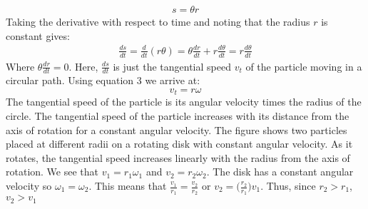 \documentclass[a4paper]{article}
\newcommand\der[2]{\frac{d #1}{d #2}}
\def\centerarc[#1](#2)(#3:#4:#5){\draw[#1] ($(#2)+({#5*cos(#3)},{#5*sin(#3)})$) arc (#3:#4:#5)}
\begin{document}
\begin{align*}
    s = \theta r
\end{align*}
\newpage
\noindent Taking the derivative with respect to time and noting that the radius $r$ is constant gives:
\begin{align*}
    \der{s}{t} = \der{}{t}(r\theta) = \theta\der{r}{t} + r\der{\theta}{t} = r\der{\theta}{t}
\end{align*}
Where $\theta\der{r}{t} = 0$. Here, $\der{s}{t}$ is just the tangential speed $v_t$ of the particle moving in a circular path. Using equation 3 we arrive at:
\begin{equation}
    v_t = r\omega
\end{equation}
The tangential speed of the particle is its angular velocity times the radius of the circle. The tangential speed of the particle increases with its distance from the axis of rotation for a constant angular velocity. The figure shows two particles placed at different radii on a rotating disk with constant angular velocity. As it rotates, the tangential speed increases linearly with the radius from the axis of rotation. We see that $v_1 = r_1\omega_1$ and $v_2 = r_2\omega_2$. The disk has a constant angular velocity so $\omega_1 = \omega_2$. This means that $\frac{v_1}{r_1} = \frac{v_2}{r_2}$ or $v_2 = \big(\frac{r_2}{r_1}\big)v_1$. Thus, since $r_2 > r_1$, $v_2 > v_1$
\begin{center}
\end{center}
\end{document}
